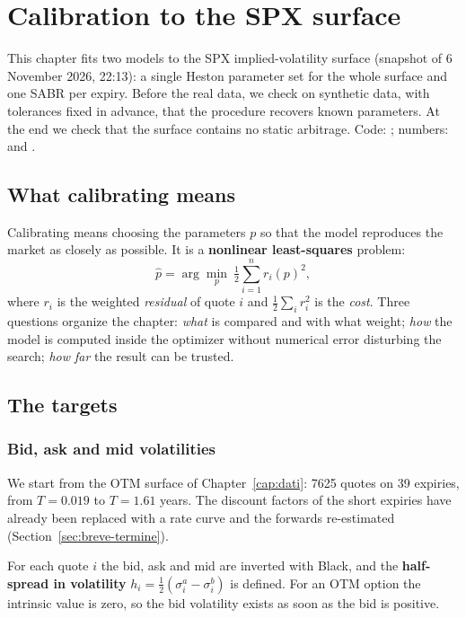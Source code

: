 \chapter{Calibration to the SPX surface}
\label{cap:calibrazione}

This chapter fits two models to the SPX implied-volatility surface (snapshot of 6 November 2026, 22:13): a single
Heston parameter set for the whole surface and one SABR per expiry. Before the real data, we check on synthetic data,
with tolerances fixed in advance, that the procedure recovers known parameters. At the end we check that the surface
contains no static arbitrage. Code: ; numbers:  and
.

\section{What calibrating means}
Calibrating means choosing the parameters $p$ so that the model reproduces the market as closely as possible. It is a
\textbf{nonlinear least-squares} problem:
\begin{equation}\label{eq:cal-ls}
\hat p=\arg\min_p\ \tfrac12\sum_{i=1}^n r_i(p)^2 ,
\end{equation}
where $r_i$ is the weighted \emph{residual} of quote $i$ and $\tfrac12\sum_ir_i^2$ is the \emph{cost}. Three
questions organize the chapter: \emph{what} is compared and with what weight; \emph{how} the model is computed inside
the optimizer without numerical error disturbing the search; \emph{how far} the result can be trusted.

\section{The targets}
\subsection{Bid, ask and mid volatilities}
We start from the OTM surface of Chapter~\ref{cap:dati}: 7625 quotes on 39 expiries, from $T=0.019$ to $T=1.61$
years. The discount factors of the short expiries have already been replaced with a rate curve and the forwards
re-estimated (Section~\ref{sec:breve-termine}).

For each quote $i$ the bid, ask and mid are inverted with Black, and the \textbf{half-spread in volatility}
$h_i=\tfrac12(\sigma^a_i-\sigma^b_i)$ is defined. For an OTM option the intrinsic value is zero, so the bid volatility
exists as soon as the bid is positive.

